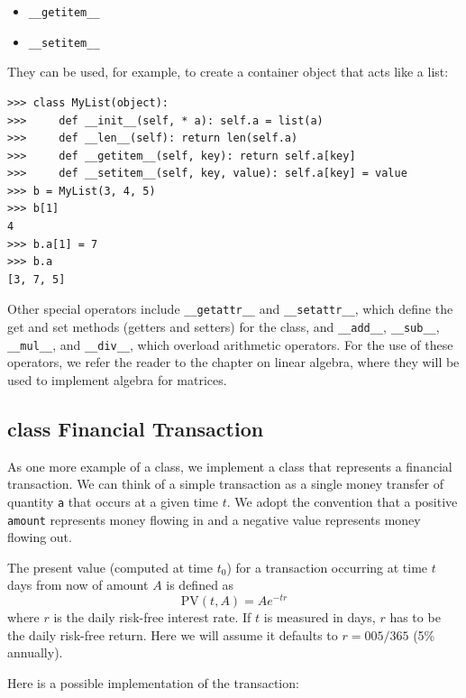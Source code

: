 \documentclass[justified, sixbynine]{tufte-book}
\def\ft{\small\tt}
\theoremstyle{plain}%
\newtheorem * {corollary}{Corollary}
\theoremstyle{definition}
\theoremstyle{remark}
\newtheorem * {remark}{Remark}
\newtheorem * {note}{Note}
\begin{document}
\begin{fullwidth}
\begin{itemize}
\item {\ft \_\_getitem\_\_}

\item {\ft \_\_setitem\_\_}
\end{itemize}
They can be used, for example, to create a container object that acts like a list:
\begin{lstlisting}
>>> class MyList(object):
>>>     def __init__(self, * a): self.a = list(a)
>>>     def __len__(self): return len(self.a)
>>>     def __getitem__(self, key): return self.a[key]
>>>     def __setitem__(self, key, value): self.a[key] = value
>>> b = MyList(3, 4, 5)
>>> b[1]
4
>>> b.a[1] = 7
>>> b.a
[3, 7, 5]
\end{lstlisting}

Other special operators include {\ft \_\_getattr\_\_} and {\ft \_\_setattr\_\_}, which define the get and set methods (getters and setters) for the class, and {\ft \_\_add\_\_}, {\ft \_\_sub\_\_}, {\ft \_\_mul\_\_}, and {\ft \_\_div\_\_}, which overload arithmetic operators. For the use of these operators, we refer the reader to the chapter on linear algebra, where they will be used to implement algebra for matrices.

\goodbreak\subsection{class Financial Transaction}


As one more example of a class, we implement a class that represents a financial transaction. We can think of a simple transaction as a single money transfer of quantity {\ft a} that occurs at a given time $t$. We adopt the convention that a positive {\ft amount} represents money flowing in and a negative value represents money flowing out.

The present value (computed at time $t_0$) for a transaction occurring at time $t$ days from now of amount $A$ is defined as
\begin{equation}
\textrm{PV}(t, A) = A e^{-t r}
\end{equation}
where $r$ is the daily risk-free interest rate. If $t$ is measured in days, $r$ has to be the daily risk-free return. Here we will assume it defaults to $r=005/365$ (5\% annually).


Here is a possible implementation of the transaction:


\end{fullwidth}
\end{document}
